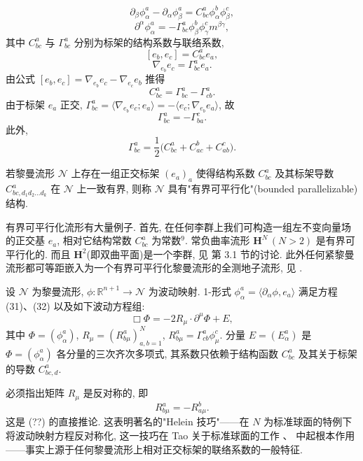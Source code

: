 \[
\partial_{\beta}\phi_{\alpha}^{a}-\partial_{\alpha}\phi_{\beta}^{a}=C_{b c}^{a}\phi_{\alpha}^{b}\phi_{\beta}^{c},
\]
\[
\partial^{\alpha}\phi_{\alpha}^{a}=-\Gamma_{b c}^{a}\phi_{\beta}^{b}\phi_{\gamma}^{c}m^{\beta\gamma},
\]
其中 $C_{bc}^{a}$ 与 $\Gamma_{bc}^{a}$ 分别为标架的结构系数与联络系数,
\[
[e_{b},e_{c}]=C_{b c}^{a}e_{a},
\]
\[
\nabla_{e_{b}}e_{c}=\Gamma_{b c}^{a}e_{a}.
\]
由公式 $[e_b, e_c] = \nabla_{e_b} e_c - \nabla_{e_c} e_b$ 推得
\[
C_{b c}^{a}=\Gamma_{b c}^{a}-\Gamma_{c b}^{a}.
\]
由于标架 $e_a$ 正交, $\Gamma^a_{bc} = \langle \nabla_{e_b} e_c ; e_a \rangle = - \langle e_c ; \nabla_{e_b} e_a \rangle$, 故
\[
\Gamma_{b c}^{a}=-\Gamma_{b a}^{c}.
\]
此外,
\[
\Gamma_{b c}^{a}=\frac{1}{2}\bigl(C_{b c}^{a}+C_{a c}^{b}+C_{a b}^{c}\bigr).
\]

\setcounter{mtthm}{10}%

\begin{definition}\label{def:2.11}
若黎曼流形 $\mathcal{N}$ 上存在一组正交标架 $(e_a)_{a}$ 使得结构系数 $C_{bc}^a$ 及其标架导数 $C_{bc,d_1d_2...d_k}^a$ 在 $\mathcal{N}$ 上一致有界, 则称 $\mathcal{N}$ 具有"有界可平行化"(bounded parallelizable)结构.\end{definition}

\begin{remark}\label{rem:2.12}
有界可平行化流形有大量例子. 首先, 在任何李群上我们可构造一组左不变向量场的正交基 $e_a$, 相对它结构常数 $C_{bc}^a$ 为常数$^{9}$. 常负曲率流形 $\mathbf{H}^N\,(N > 2)$ 是有界可平行化的. 而且 $\mathbf{H}^2$(即双曲平面)是一个李群, 见 \cite{klai11} 第 3.1 节的讨论. 此外任何紧黎曼流形都可等距嵌入为一个有界可平行化黎曼流形的全测地子流形, 见 \cite{klai11}.\end{remark}

\begin{proposition}\label{prop:2.13}
设 $\mathcal{N}$ 为黎曼流形, $\phi: \mathbb{R}^{n+1} \to \mathcal{N}$ 为波动映射. 1-形式 $\phi_\alpha^a = \langle \partial_\alpha \phi, e_a \rangle$ 满足方程 (31)、(32) 以及如下波动方程组:
\[
\Box\Phi=-2R_{\mu}\cdot\partial^{\mu}\Phi+E,
\]
其中 $\Phi = (\phi_{\alpha}^{a})$, $R_{\mu} = (R_{b\mu}^{a})_{a,b=1}^{N}$, $R_{b\mu}^{a} = \Gamma_{cb}^{a}\phi_{\mu}^{c}$. 分量 $E = (E_{\alpha}^{a})$ 是 $\Phi = (\phi_{\alpha}^{a})$ 各分量的三次齐次多项式, 其系数只依赖于结构函数 $C_{bc}^{a}$ 及其关于标架的导数 $C_{bc,d}^{a}$.\end{proposition}

\begin{remark}\label{rem:2.14}
必须指出矩阵 $R_{\mu}$ 是反对称的, 即
\[
R_{b\mu}^{a}=-R_{a\mu}^{b}.
\]
这是 (??) 的直接推论. 这表明著名的"Helein 技巧"------在 $N$ 为标准球面的特例下将波动映射方程反对称化, 这一技巧在 Tao 关于标准球面的工作 \cite{klai70}、\cite{klai71} 中起根本作用------事实上源于任何黎曼流形上相对正交标架的联络系数的一般特征.\end{remark}

